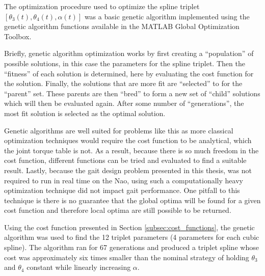 The optimization procedure used to optimize the spline triplet $[\theta_3(t), \theta_4(t), \alpha(t)]$
was a basic genetic algorithm implemented using the genetic algorithm functions available in the MATLAB 
Global Optimization Toolbox. 

Briefly, genetic algorithm optimization works by first creating a ``population'' of
possible solutions, in this case the parameters for the spline triplet. Then the ``fitness'' of each solution
is determined, here by evaluating the cost function for the solution. Finally, the solutions that are more fit
are ``selected'' to for the ``parent'' set. These parents are then ``bred'' to form a new set of ``child'' solutions
which will then be evaluated again. After some number of ``generations'', the most fit solution is selected
as the optimal solution.

Genetic algorithms are well suited for problems like this as more classical optimization techniques
would require the cost function to be analytical, which the joint torque table is not.
As a result, because there is so much freedom in the cost function, different functions can be tried
and evaluated to find a suitable result.
Lastly, because the gait design problem presented in this thesis, was not required to run in real time on the
Nao, using such a computationally heavy optimization technique did not impact gait performance.
One pitfall to this technique is there is no guarantee that the global optima will be found for
a given cost function and therefore local optima are still possible to be returned.

Using the cost function presented in Section \ref{subsec:cost_functions}, the genetic algorithm was used
to find the 12 triplet parameters (4 parameters for each cubic spline). The algorithm ran for 67 generations
and produced a triplet spline whose cost was approximately six times smaller than the nominal strategy
of holding $\theta_3$ and $\theta_4$ constant while linearly increasing $\alpha$.
